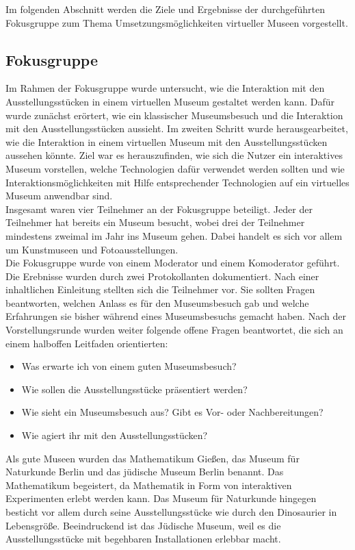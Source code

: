 \documentclass[runningheads,a4paper, 12pt]{llncs}
\begin{document}
Im folgenden Abschnitt werden die Ziele und Ergebnisse der durchgeführten Fokusgruppe zum Thema Umsetzungsmöglichkeiten virtueller Museen vorgestellt.\\

\subsection{Fokusgruppe}
Im Rahmen der Fokusgruppe wurde untersucht, wie die Interaktion mit den Ausstellungsstücken in einem virtuellen Museum gestaltet werden kann. Dafür wurde zunächst erörtert, wie ein klassischer Museumsbesuch und die Interaktion mit den Ausstellungsstücken aussieht. Im zweiten Schritt wurde herausgearbeitet, wie die Interaktion in einem virtuellen Museum mit den Ausstellungsstücken aussehen könnte. Ziel war es herauszufinden, wie sich die Nutzer ein interaktives Museum vorstellen, welche Technologien dafür verwendet werden sollten und wie Interaktionsmöglichkeiten mit Hilfe entsprechender Technologien auf ein virtuelles Museum anwendbar sind.\\

Insgesamt waren vier Teilnehmer an der Fokusgruppe beteiligt. Jeder der Teilnehmer hat bereits ein Museum besucht, wobei drei der Teilnehmer mindestens zweimal im Jahr ins Museum gehen. Dabei handelt es sich vor allem um Kunstmuseen und Fotoausstellungen.\\

Die Fokusgruppe wurde von einem Moderator und einem Komoderator geführt. Die Erebnisse wurden durch zwei Protokollanten dokumentiert. Nach einer inhaltlichen Einleitung stellten sich die Teilnehmer vor. Sie sollten Fragen beantworten, welchen Anlass es für den Museumsbesuch gab und welche Erfahrungen sie bisher während eines Museumsbesuchs gemacht haben. Nach der Vorstellungsrunde wurden weiter folgende offene Fragen beantwortet, die sich an einem halboffen Leitfaden orientierten:
\begin{itemize}
	\item Was erwarte ich von einem guten Museumsbesuch?
	\item Wie sollen die Ausstellungsstücke präsentiert werden?
	\item Wie sieht ein Museumsbesuch aus? Gibt es Vor- oder Nachbereitungen?
	\item Wie agiert ihr mit den Ausstellungsstücken?
\end{itemize}

Als gute Museen wurden das Mathematikum Gießen, das Museum für Naturkunde Berlin und das jüdische Museum Berlin benannt. Das Mathematikum begeistert, da Mathematik in Form von interaktiven Experimenten erlebt werden kann. Das Museum für Naturkunde hingegen besticht vor allem durch seine Ausstellungsstücke wie durch den Dinosaurier in Lebensgröße. Beeindruckend ist das Jüdische Museum, weil es die Ausstellungsstücke mit begehbaren Installationen erlebbar macht.\\
\end{document}
